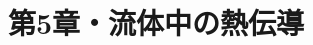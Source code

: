 \documentclass{ltjsarticle}
\title{第5章・流体中の熱伝導}
\date{\DTMnow}
\begin{document}
\maketitle



\hypertarget{targetofBackToTheToc}{}
\tableofcontents

\setcounter{section}{48}










\end{document}
